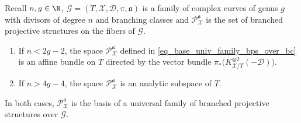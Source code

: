 \begin{proposition}\label{proposition_univ_family_bps_low_high_deg}
Recall $n, g \in \N$, $\mathcal G = (T, \mathcal X, \mathcal D, \pi, \mathfrak a)$ is a family of complex curves of genus $g$ with divisors of degree $n$ and branching classes and $\mathcal P_{\mathcal X}^{\mathfrak a}$ is the set of branched projective structures on the fibers of $\mathcal G$.
\begin{enumerate}
\item
If $n < 2g-2$, the space $\mathcal P_{\mathcal X}^{\mathfrak a}$ defined in \eqref{eq_base_univ_family_bps_over_bc} is an affine bundle on $T$ directed by the vector bundle $\pi_*\bigl(K_{\mathcal X/T}^{\otimes 2}(-\mathcal D)\bigr)$.
\item
If $n > 4g-4$, the space $\mathcal P_{\mathcal X}^{\mathfrak a}$ is an analytic subspace of $T$.
\end{enumerate}
In both cases, $\mathcal P_{\mathcal X}^{\mathfrak a}$ is the basis of a universal family of branched projective structures over $\mathcal G$.
\end{proposition}
